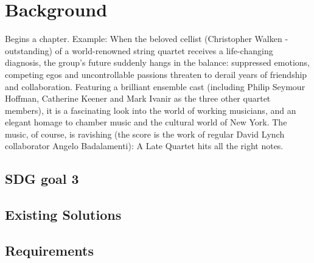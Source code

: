 %
%
\chapter{Background}
\label{chap:background}

Begins a chapter. Example: When the beloved cellist (Christopher Walken - outstanding) of a world-renowned string quartet receives a life-changing diagnosis, the group's future suddenly hangs in the balance: suppressed emotions, competing egos and uncontrollable passions threaten to derail years of friendship and collaboration. Featuring a brilliant ensemble cast (including Philip Seymour Hoffman, Catherine Keener and Mark Ivanir as the three other quartet members), it is a fascinating look into the world of working musicians, and an elegant homage to chamber music and the cultural world of New York. The music, of course, is ravishing (the score is the work of regular David Lynch collaborator Angelo Badalamenti): A Late Quartet hits all the right notes.


\section{SDG goal 3}
\label{sec:sec01}

\section{Existing Solutions}
\label{sec:sec02}

\section{Requirements}
\label{sec:sec03}